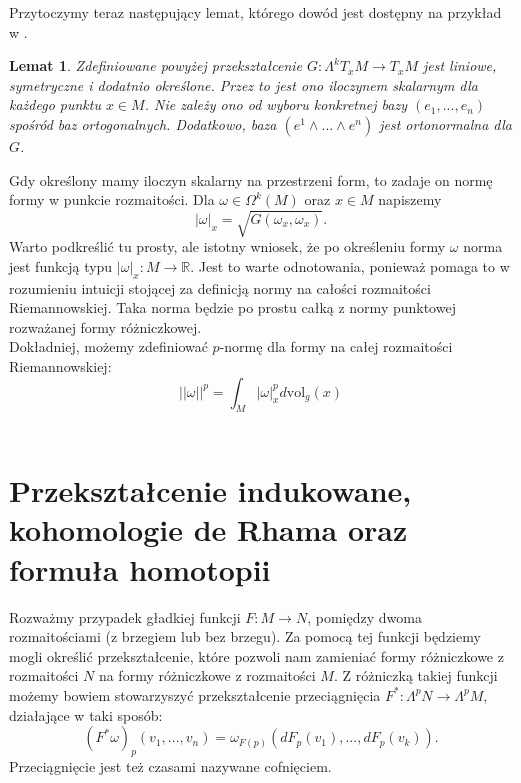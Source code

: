 \documentclass[licencjacka]{pracamgr}
\theoremstyle{definition}
\theoremstyle{definition}
\theoremstyle{plain}
\newtheorem{lemma}{Lemat}[section]
\theoremstyle{plain}
\begin{document}
Przytoczymy teraz następujący lemat, którego dowód jest dostępny na przykład
 w \cite{lausanne}.

\begin{lemma}
    Zdefiniowane powyżej przekształcenie $G: \Lambda^k T_x M \rightarrow T_x M $ 
    jest liniowe, symetryczne i dodatnio określone. Przez to jest ono iloczynem
    skalarnym dla każdego punktu $x \in M$.  Nie zależy ono od wyboru konkretnej bazy
    $(e_1, ..., e_n)$ spośród baz ortogonalnych.  Dodatkowo, baza
    $(e^1 \wedge ... \wedge e^n)$ jest ortonormalna dla $G$.
\end{lemma}


Gdy określony mamy iloczyn skalarny na przestrzeni form, to zadaje on 
normę formy w punkcie rozmaitości. Dla $\omega \in \Omega^k(M)$ oraz $x \in M$
napiszemy
\[
    |\omega|_x = \sqrt{ G(\omega_x, \omega_x) }.
\]
Warto podkreślić tu prosty, ale istotny wniosek, że po określeniu formy $\omega$
norma jest funkcją typu $| \omega |_x : M \rightarrow \mathbb{R} $. Jest to warte
odnotowania, ponieważ pomaga to w rozumieniu intuicji stojącej za definicją normy
na całości rozmaitości Riemannowskiej. Taka norma będzie po prostu całką 
z normy punktowej rozważanej formy różniczkowej. \\

Dokładniej, możemy zdefiniować $p$-normę dla formy na całej rozmaitości
Riemannowskiej:
\begin{equation} \label{big-norm}
  || \omega ||^p =  \int_M |\omega|_x^p d \text{vol}_g(x)
\end{equation} \\



\section{Przekształcenie indukowane, kohomologie de Rhama oraz formuła homotopii}
Rozważmy przypadek gładkiej funkcji $F: M \rightarrow N$, pomiędzy
dwoma rozmaitościami (z brzegiem lub bez brzegu). Za pomocą tej
funkcji będziemy mogli określić przekształcenie, które pozwoli nam
zamieniać formy różniczkowe z rozmaitości $N$ na formy różniczkowe z
rozmaitości $M$. Z różniczką takiej funkcji możemy bowiem stowarzyszyć
przekształcenie
przeciągnięcia $F^\ast: \Lambda^p N \rightarrow \Lambda^p M$, działające w taki sposób:
\[
    (F^\ast \omega)_p(v_1, ..., v_n) =
        \omega_{F(p)}(dF_p(v_1), ..., dF_p(v_k)).
\] Przeciągnięcie jest też czasami nazywane cofnięciem. \\
\end{document}
